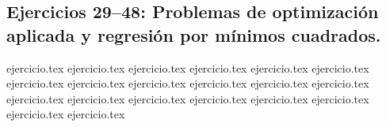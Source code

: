 \subsection*{Ejercicios 29--48: Problemas de optimización aplicada y regresión por mínimos cuadrados.}
\begin{enumerate}
    \setcounter{enumi}{28}
    {ejercicio.tex}
    {ejercicio.tex}
    {ejercicio.tex}
    {ejercicio.tex}
    {ejercicio.tex}
    {ejercicio.tex}
    {ejercicio.tex}
    {ejercicio.tex}
    {ejercicio.tex}
    {ejercicio.tex}
    {ejercicio.tex}
    {ejercicio.tex}
    {ejercicio.tex}
    {ejercicio.tex}
    {ejercicio.tex}
    {ejercicio.tex}
    {ejercicio.tex}
    {ejercicio.tex}
    {ejercicio.tex}
    {ejercicio.tex}
\end{enumerate}
